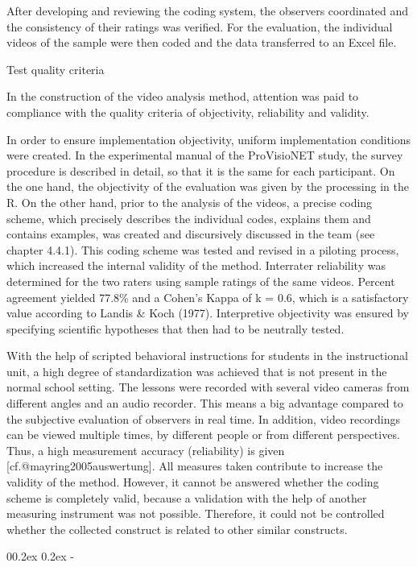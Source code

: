 \documentclass[
  man]{apa6}
\makeatletter
\let\oldsubparagraph\subparagraph
\renewcommand{\subparagraph}[1]{\oldsubparagraph{#1}\mbox{}}
\renewcommand{\subparagraph}[1]{\@startsection{subparagraph}{5}{1em}%
  {0\baselineskip \@plus 0.2ex \@minus 0.2ex}%
  {-\z@\relax}%
  {\normalfont\normalsize\itshape\hspace{\parindent}{#1}\textit{\addperi}}{\relax}}
\makeatother
\begin{document}
After developing and reviewing the coding system, the observers coordinated and the consistency of their ratings was verified. For the evaluation, the individual videos of the sample were then coded and the data transferred to an Excel file.

Test quality criteria

In the construction of the video analysis method, attention was paid to compliance with the quality criteria of objectivity, reliability and validity.

In order to ensure implementation objectivity, uniform implementation conditions were created. In the experimental manual of the ProVisioNET study, the survey procedure is described in detail, so that it is the same for each participant. On the one hand, the objectivity of the evaluation was given by the processing in the R. On the other hand, prior to the analysis of the videos, a precise coding scheme, which precisely describes the individual codes, explains them and contains examples, was created and discursively discussed in the team (see chapter 4.4.1). This coding scheme was tested and revised in a piloting process, which increased the internal validity of the method. Interrater reliability was determined for the two raters using sample ratings of the same videos. Percent agreement yielded 77.8\% and a Cohen's Kappa of k = 0.6, which is a satisfactory value according to Landis \& Koch (1977). Interpretive objectivity was ensured by specifying scientific hypotheses that then had to be neutrally tested.

With the help of scripted behavioral instructions for students in the instructional unit, a high degree of standardization was achieved that is not present in the normal school setting. The lessons were recorded with several video cameras from different angles and an audio recorder. This means a big advantage compared to the subjective evaluation of observers in real time. In addition, video recordings can be viewed multiple times, by different people or from different perspectives. Thus, a high measurement accuracy (reliability) is given {[}cf.@mayring2005auswertung{]}. All measures taken contribute to increase the validity of the method. However, it cannot be answered whether the coding scheme is completely valid, because a validation with the help of another measuring instrument was not possible. Therefore, it could not be controlled whether the collected construct is related to other similar constructs.

\subparagraph{Coding Time on Task}\label{coding-time-on-task}
\end{document}
